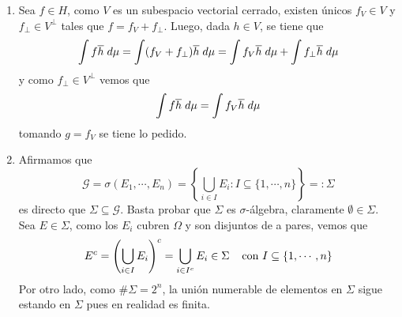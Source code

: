 \documentclass{article}
\begin{document}
\begin{enumerate}
    \item Sea $f\in H$, como $V$ es un subespacio vectorial cerrado, existen únicos $f_{V}\in V$ y 
    $f_{\perp}\in V^{\perp}$ tales que $f=f_{V}+f_{\perp}$. Luego, dada $h\in V$, se tiene que
    \begin{equation*}
        \int f\overline{h}\hspace{1mm}d\mu=\int (f_{V}+f_{\perp})\overline{h}\hspace{1mm}d\mu
        =\int f_{V}\overline{h}\hspace{1mm}d\mu+\int f_{\perp}\overline{h}\hspace{1mm}d\mu
    \end{equation*}
    y como $f_{\perp}\in V^{\perp}$ vemos que
    \begin{equation*}
        \int f\overline{h}\hspace{1mm}d\mu=\int f_{V}\overline{h}\hspace{1mm}d\mu
    \end{equation*}
    tomando $g=f_{V}$ se tiene lo pedido.

    \item Afirmamos que
    \begin{equation*}
        \mathcal{G}=\sigma(E_{1},\cdots,E_{n})=\left\{\bigcup_{i\in I}E_{i}:I\subseteq
        \{1,\cdots,n\}\right\}=:\Sigma
    \end{equation*}
    es directo que $\Sigma\subseteq\mathcal{G}$. Basta probar que $\Sigma$ es $\sigma$-álgebra, 
    claramente $\emptyset\in\Sigma$. Sea $E\in\Sigma$, como los $E_{i}$ cubren $\Omega$ y son 
    disjuntos de a pares, vemos que
    \begin{equation*}
        E^{c}=\left(\bigcup_{i\in I}E_{i}\right)^{c}=\bigcup_{i\in I^{c}}E_{i}\in\Sigma
        \hspace{4mm}\text{con }I\subseteq\{1,\cdots,n\}
    \end{equation*}
    Por otro lado, como $\#\Sigma=2^{n}$, la unión numerable de elementos en $\Sigma$ sigue 
    estando en $\Sigma$ pues en realidad es finita. 
    

\end{enumerate}
\end{document}
